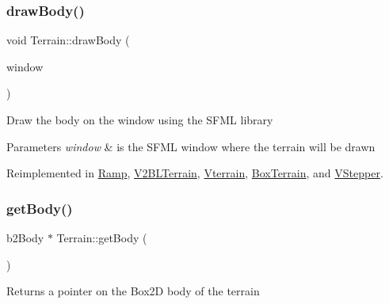 \mbox{\label{class_terrain_ae60571b91c1979fa94bdfc5002da6ac7}} 
\subsubsection{\texorpdfstring{draw\+Body()}{drawBody()}}
{\footnotesize\ttfamily void Terrain\+::draw\+Body (\begin{DoxyParamCaption}\item[{sf\+::\+Render\+Window \&}]{window }\end{DoxyParamCaption})\hspace{0.3cm}{\ttfamily [virtual]}}

Draw the body on the window using the S\+F\+ML library 
\begin{DoxyParams}{Parameters}
{\em window} & is the S\+F\+ML window where the terrain will be drawn \\
\hline
\end{DoxyParams}


Reimplemented in \mbox{\hyperlink{class_ramp_ab05c0a8c5706488be4aba9c4f52f55c9}{Ramp}}, \mbox{\hyperlink{class_v2_b_l_terrain_aea63be5e3b6d05da4c3b5ce954429a4b}{V2\+B\+L\+Terrain}}, \mbox{\hyperlink{class_vterrain_a4be34646206e14fe5f5aa3d39761e3fe}{Vterrain}}, \mbox{\hyperlink{class_box_terrain_a309e67722a008ef166198d36add1690a}{Box\+Terrain}}, and \mbox{\hyperlink{class_v_stepper_ad81367e4f7422afcd460fd0094a25bc3}{V\+Stepper}}.

\mbox{\label{class_terrain_aa0e70c6bbd39935c69c2b6edb74fcd32}} 
\subsubsection{\texorpdfstring{get\+Body()}{getBody()}}
{\footnotesize\ttfamily b2\+Body $\ast$ Terrain\+::get\+Body (\begin{DoxyParamCaption}{ }\end{DoxyParamCaption})}

\begin{DoxyReturn}{Returns}
a pointer on the Box2D body of the terrain 
\end{DoxyReturn}
\mbox{\label{class_terrain_a26e1c7c05b8256015730df34d97d29c2}} 
